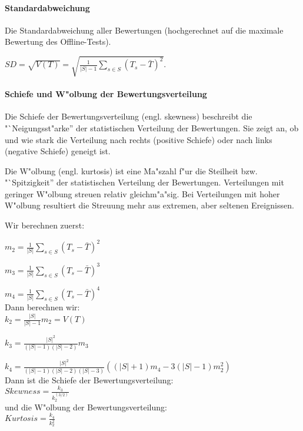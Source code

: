 \documentclass[12pt]{report}
\begin{document}
\paragraph{Standardabweichung}
Die Standardabweichung aller Bewertungen (hochgerechnet auf die maximale Bewertung des Offline-Tests).

$SD = \sqrt{V(T)} = \sqrt{\frac{1}{|S| - 1}\sum\limits_{s\in S}(T_s - \bar{T})^2}$.

\paragraph{Schiefe und W"olbung der Bewertungsverteilung}
Die Schiefe der Bewertungsverteilung (engl. skewness) beschreibt die "`Neigungsst"arke'' der statistischen Verteilung der Bewertungen. Sie zeigt an, ob und wie stark die Verteilung nach rechts (positive Schiefe) oder nach links (negative Schiefe) geneigt ist.

Die W"olbung (engl. kurtosis) ist eine Ma"szahl f"ur die Steilheit bzw. "`Spitzigkeit'' der statistischen Verteilung der Bewertungen. Verteilungen mit geringer W"olbung streuen relativ gleichm"a"sig. Bei Verteilungen mit hoher W"olbung resultiert die Streuung mehr aus extremen, aber seltenen Ereignissen.

Wir berechnen zuerst:

$m_2=\frac{1}{|S|}\sum\limits_{s\in S}{(T_s - \bar{T})^2}$

$m_3=\frac{1}{|S|}\sum\limits_{s\in S}{(T_s - \bar{T})^3}$

$m_4=\frac{1}{|S|}\sum\limits_{s\in S}{(T_s - \bar{T})^4}$\\

Dann berechnen wir:\\

$k_2 = \frac{|S|}{|S| - 1}m_2 = V(T)$

$k_3 = \frac{|S|^2}{(|S|-1)(|S|-2)} m_3$

$k_4 = \frac{|S|^2}{(|S|-1)(|S|-2)(|S|-3)}\left((|S|+1)m_4-3(|S|-1)m_2^2\right)$\\

Dann ist die Schiefe der Bewertungsverteilung:\\

 $Skewness = \frac{k_3}{k_2^(3/2)}$\\

und die W"olbung der Bewertungsverteilung:\\

 $Kurtosis = \frac{k_4}{k_2^2}$
\end{document}
